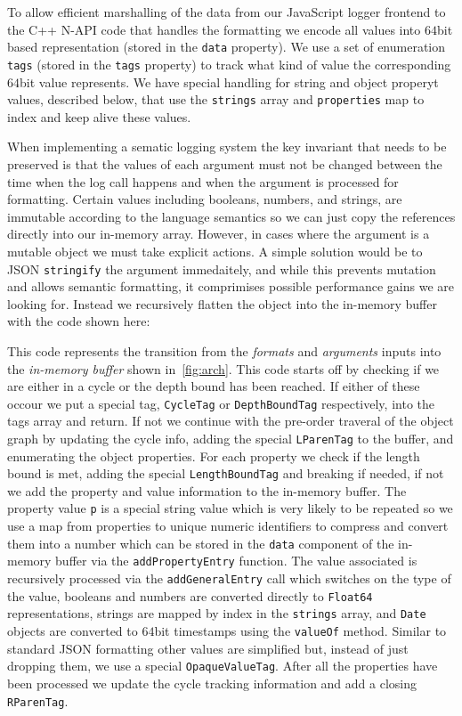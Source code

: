 To allow efficient marshalling of the data from our JavaScript logger frontend 
to the C++ N-API code that handles the formatting we encode all values into 
$64$bit based representation (stored in the \texttt{data} property). We use a set 
of enumeration \texttt{tags} (stored in the \texttt{tags} property) to track 
what kind of value the corresponding $64$bit value represents. We have special 
handling for string and object properyt values, described below, that use the 
\texttt{strings} array and \texttt{properties} map to index and keep alive these values.

When implementing a sematic logging system the key invariant that needs to be 
preserved is that the values of each argument must not be changed between the 
time when the log call happens and when the argument is processed for 
formatting. Certain values including booleans, numbers, and strings, are 
immutable according to the language semantics so we can just copy the 
references directly into our in-memory array. However, in cases where the 
argument is a mutable object we must take explicit actions. A simple solution 
would be to JSON \texttt{stringify} the argument immedaitely, and while this 
prevents mutation and allows semantic formatting, it comprimises possible 
performance gains we are looking for. Instead we recursively flatten the object 
into the in-memory buffer with the code shown here:


This code represents the transition from the \emph{formats} and \emph{arguments} 
inputs into the \emph{in-memory buffer} shown in~\autoref{fig:arch}. This code 
starts off by checking if we are either in a cycle or the depth bound has been 
reached. If either of these occour we put a special tag, \texttt{CycleTag} or 
\texttt{DepthBoundTag} respectively, into the tags array and return. If not we 
continue with the pre-order traveral of the object graph by updating the cycle 
info, adding the special \texttt{LParenTag} to the buffer, and enumerating the 
object properties. For each property we check if the length bound is met, adding 
the special \texttt{LengthBoundTag} and breaking if needed, if not we add the 
property and value information to the in-memory buffer. The property value \texttt{p} 
is a special string value which is very likely to be repeated so we use a map 
from properties to unique numeric identifiers to compress and convert them into 
a number which can be stored in the \texttt{data} component of the in-memory buffer 
via the \texttt{addPropertyEntry} function. The value associated is recursively 
processed via the \texttt{addGeneralEntry} call which switches on the type of the 
value, booleans and numbers are converted directly to \texttt{Float64} representations, 
strings are mapped by index in the \texttt{strings} array, and \texttt{Date} objects 
are converted to $64$bit timestamps using the \texttt{valueOf} method. Similar to 
standard JSON formatting other values are simplified but, instead of just dropping 
them, we use a special \texttt{OpaqueValueTag}. After all the properties have 
been processed we update the cycle tracking information and add a closing 
\texttt{RParenTag}.

